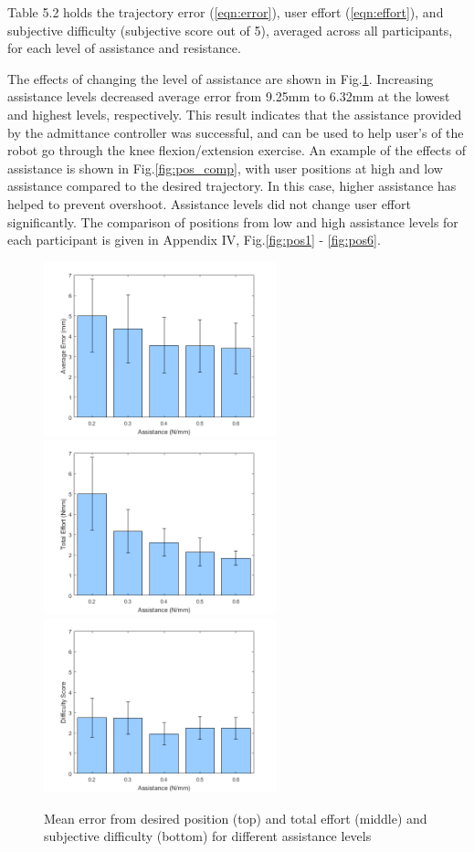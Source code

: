 \documentclass[12pt]{report}
\begin{document}
	Table 5.2 holds the trajectory error (\ref{eqn:error}), user effort (\ref{eqn:effort}), and subjective difficulty (subjective score out of 5), averaged across all participants,	for each level of assistance and resistance. 
	
	The effects of changing the level of assistance are shown in Fig.\ref{fig:assist}. Increasing assistance levels decreased average error from 9.25mm to 6.32mm at the lowest and highest levels, respectively. This result indicates that the assistance provided by the admittance controller was successful, and can be used to help user's of the robot go through the knee flexion/extension exercise. An example of the effects of assistance is shown in Fig.\ref{fig:pos_comp}, with user positions at high and low assistance compared to the desired trajectory. In this case, higher assistance has helped to prevent overshoot. Assistance levels did not change user effort significantly. The comparison of positions from low and high assistance levels for each participant is given in Appendix IV, Fig.\ref{fig:pos1} - \ref{fig:pos6}.
	
	\begin{figure}[p]
	\centering
	\includegraphics[width=0.6\textwidth]{err_assist}
	\includegraphics[width=0.6\textwidth]{eff_assist}
	\includegraphics[width=0.6\textwidth]{diff_assist}
	\caption{Mean error from desired position (top) and total effort (middle) and subjective difficulty (bottom) for different assistance levels}
	\label{fig:assist}
\end{figure}	
\end{document}
